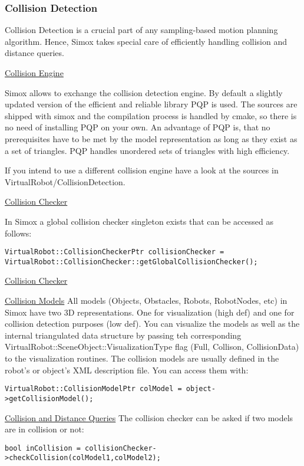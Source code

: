 \subsubsection*{Collision Detection}
Collision Detection is a crucial part of any sampling-based motion planning algorithm. Hence, Simox takes special care of efficiently handling collision and distance queries. 
\par
\underline{Collision Engine}
\par
Simox allows to exchange the collision detection engine. By default a slightly updated version of the efficient and reliable library PQP is used. The sources are shipped with simox and the compilation process is handled by cmake, so there is no need of installing PQP on your own. An advantage of PQP is, that no prerequisites have to be met by the model representation as long as they exist as a set of triangles. PQP handles unordered sets of triangles with high efficiency.
\par
If you intend to use a different collision engine have a look at the sources in VirtualRobot/CollisionDetection. 
\par
\underline{Collision Checker}
\par
In Simox a global collision checker singleton exists that can be accessed as follows: 
\begin{lstlisting}
VirtualRobot::CollisionCheckerPtr collisionChecker = VirtualRobot::CollisionChecker::getGlobalCollisionChecker();
\end{lstlisting}
\par
\underline{Collision Checker}
\par
\underline{Collision Models}
All models (Objects, Obstacles, Robots, RobotNodes, etc) in Simox have two 3D representations. One for visualization (high def) and one for collision detection purposes (low def). You can visualize the models as well as the internal triangulated data structure by passing teh corresponding VirtualRobot::SceneObject::VisualizationType flag (Full, Collison, CollisionData) to the visualization routines. The collision models are usually defined in the robot's or object's XML description file. You can access them with: 
\begin{lstlisting}
VirtualRobot::CollisionModelPtr colModel = object->getCollisionModel();
\end{lstlisting}
\underline{Collision and Distance Queries}
The collision checker can be asked if two models are in collision or not:  
\begin{lstlisting}
bool inCollision = collisionChecker->checkCollision(colModel1,colModel2);
\end{lstlisting}
